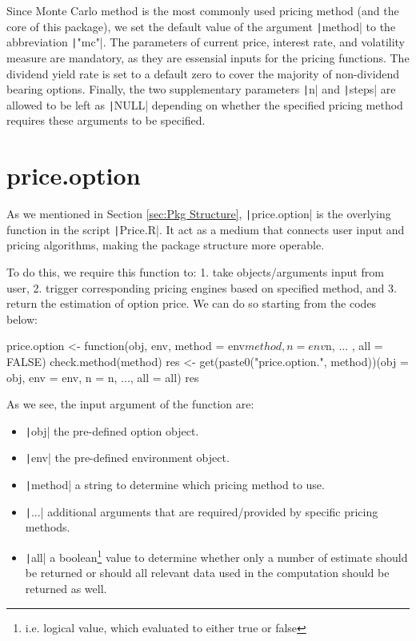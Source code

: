 Since Monte Carlo method is the most commonly used pricing method (and the core of this package), we set the default value of the argument \texttt|method| to the abbreviation \texttt|"mc"|. The parameters of current price, interest rate, and volatility measure are mandatory, as they are essensial inputs for the pricing functions. The dividend yield rate is set to a default zero to cover the majority of non-dividend bearing options. Finally, the two supplementary parameters \texttt|n| and \texttt|steps| are allowed to be left as \texttt|NULL| depending on whether the specified pricing method requires these arguments to be specified.

\section{price.option}

As we mentioned in Section \ref{sec:Pkg Structure}, \texttt|price.option| is the overlying function in the script \texttt|Price.R|. It act as a medium that connects user input and pricing algorithms, making the package structure more operable.

To do this, we require this function to: 1. take objects/arguments input from user, 2. trigger corresponding pricing engines based on specified method, and 3. return the estimation of option price. We can do so starting from the codes below:

\begin{Rminted}
price.option <- function(obj, env, method = env$method, n = env$n, ... , all = FALSE) {
    check.method(method)
    res <- get(paste0("price.option.", method))(obj = obj, env = env, n = n, ..., all = all)
    res
}
\end{Rminted}

As we see, the input argument of the function are:

\begin{itemize}
    \item \texttt|obj| the pre-defined option object.
    \item \texttt|env| the pre-defined environment object.
    \item \texttt|method| a string to determine which pricing method to use.
    \item \texttt|...| additional arguments that are required/provided by specific pricing methods.
    \item \texttt|all| a boolean\footnote{i.e. logical value, which evaluated to either true or false} value to determine whether only a number of estimate should be returned or should all relevant data used in the computation should be returned as well.
\end{itemize}

